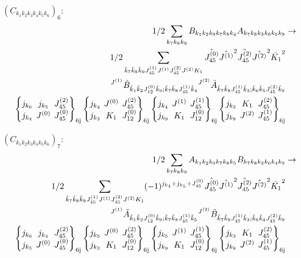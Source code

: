 \documentclass[11pt]{article}
\newcommand{\sixj}[6]{\begingroup\setlength{\arraycolsep}{0.2em}\begin{Bmatrix} #1 & #2 & #3 \\ #4 & #5 & #6 \end{Bmatrix}_{\text{6j}}\endgroup}
\begin{document}
$\left({C}_{{k}_{1}{k}_{2}{k}_{3}{k}_{4}{k}_{5}{k}_{6}}\right)_{6}$:
\begin{align}
1/2\sum_{{k}_{7}{k}_{8}{k}_{9}}{B}_{{k}_{1}{k}_{2}{k}_{9}{k}_{7}{k}_{8}{k}_{4}}{A}_{{k}_{7}{k}_{8}{k}_{3}{k}_{6}{k}_{5}{k}_{9}}&\rightarrow \notag \\1/2\sum_{\tilde{k}_{7}\tilde{k}_{8}\tilde{k}_{9}J^{(1)}_{45}J^{(1)}J^{(2)}_{45}J^{(2)}K_{1}}\hat{J^{(0)}_{45}}\hat{J^{(1)}}^{2}\hat{J^{(2)}_{45}}\hat{J^{(2)}}^{2}\hat{K_{1}}^{2}& \notag \\{}^{J^{(1)}}\tilde{B}_{\tilde{k}_{1}\tilde{k}_{2}J^{(0)}_{12}\tilde{k}_{9};\tilde{k}_{7}\tilde{k}_{8}J^{(1)}_{45}\tilde{k}_{4}}{}^{J^{(2)}}\tilde{A}_{\tilde{k}_{7}\tilde{k}_{8}J^{(1)}_{45}\tilde{k}_{3};\tilde{k}_{6}\tilde{k}_{5}J^{(2)}_{45}\tilde{k}_{9}}& \notag \\\sixj{j_{{k}_{6}}}{j_{{k}_{5}}}{J^{(2)}_{45}}{j_{{k}_{4}}}{J^{(0)}}{J^{(0)}_{45}}\sixj{j_{{k}_{4}}}{J^{(0)}}{J^{(2)}_{45}}{j_{{k}_{3}}}{K_{1}}{J^{(0)}_{12}}\sixj{j_{{k}_{4}}}{J^{(1)}}{J^{(1)}_{45}}{j_{{k}_{9}}}{K_{1}}{J^{(0)}_{12}}\sixj{j_{{k}_{3}}}{K_{1}}{J^{(2)}_{45}}{j_{{k}_{9}}}{J^{(2)}}{J^{(1)}_{45}}
\end{align}

$\left({C}_{{k}_{1}{k}_{2}{k}_{3}{k}_{4}{k}_{5}{k}_{6}}\right)_{7}$:
\begin{align}
1/2\sum_{{k}_{7}{k}_{8}{k}_{9}}{A}_{{k}_{1}{k}_{2}{k}_{9}{k}_{7}{k}_{8}{k}_{5}}{B}_{{k}_{7}{k}_{8}{k}_{3}{k}_{6}{k}_{4}{k}_{9}}&\rightarrow \notag \\1/2\sum_{\tilde{k}_{7}\tilde{k}_{8}\tilde{k}_{9}J^{(1)}_{45}J^{(1)}J^{(2)}_{45}J^{(2)}K_{1}}(-1)^{j_{{k}_{4}} +j_{{k}_{5}} +J^{(0)}_{45} }\hat{J^{(0)}_{45}}\hat{J^{(1)}}^{2}\hat{J^{(2)}_{45}}\hat{J^{(2)}}^{2}\hat{K_{1}}^{2}& \notag \\{}^{J^{(1)}}\tilde{A}_{\tilde{k}_{1}\tilde{k}_{2}J^{(0)}_{12}\tilde{k}_{9};\tilde{k}_{7}\tilde{k}_{8}J^{(1)}_{45}\tilde{k}_{5}}{}^{J^{(2)}}\tilde{B}_{\tilde{k}_{7}\tilde{k}_{8}J^{(1)}_{45}\tilde{k}_{3};\tilde{k}_{6}\tilde{k}_{4}J^{(2)}_{45}\tilde{k}_{9}}& \notag \\\sixj{j_{{k}_{6}}}{j_{{k}_{4}}}{J^{(2)}_{45}}{j_{{k}_{5}}}{J^{(0)}}{J^{(0)}_{45}}\sixj{j_{{k}_{5}}}{J^{(0)}}{J^{(2)}_{45}}{j_{{k}_{3}}}{K_{1}}{J^{(0)}_{12}}\sixj{j_{{k}_{5}}}{J^{(1)}}{J^{(1)}_{45}}{j_{{k}_{9}}}{K_{1}}{J^{(0)}_{12}}\sixj{j_{{k}_{3}}}{K_{1}}{J^{(2)}_{45}}{j_{{k}_{9}}}{J^{(2)}}{J^{(1)}_{45}}
\end{align}
\end{document}

